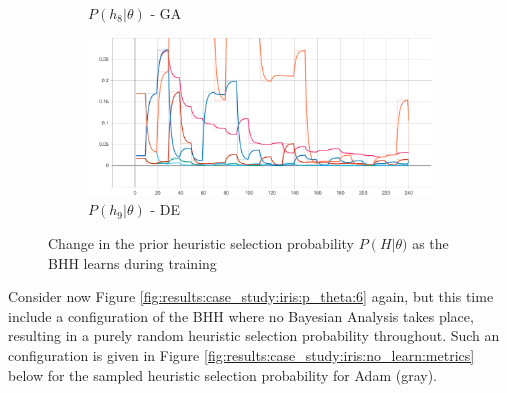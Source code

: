 \begin{figure}[htbp]
\begin{subfigure}{0.5\textwidth}
		\caption{$P\left(h_{8} | \theta \right)$ - \Acs{GA}}
		\label{fig:results:case_study:iris:p_H:8}
	\end{subfigure}
	\begin{subfigure}{0.5\textwidth}
		\centering
		\includegraphics[width=\textwidth]{analysis/bhh_case_study/iris/p_H[9].png}
		\caption{$P\left(h_{9} | \theta \right)$ - \Acs{DE}}
		\label{fig:results:case_study:iris:p_H:9}
	\end{subfigure}
	\par\medskip
	\caption{Change in the prior heuristic selection probability $P\left(H\right | \theta )$ as the \Ac{BHH} learns during training}
	\label{fig:results:case_study:iris:p_H}
\end{figure}


Consider now Figure \ref{fig:results:case_study:iris:p_theta:6} again, but this time include a configuration of the \Acs{BHH} where no Bayesian Analysis takes place, resulting in a purely random heuristic selection probability throughout. Such an configuration is given in Figure \ref{fig:results:case_study:iris:no_learn:metrics} below for the sampled heuristic selection probability for \Acs{Adam} (gray). 

